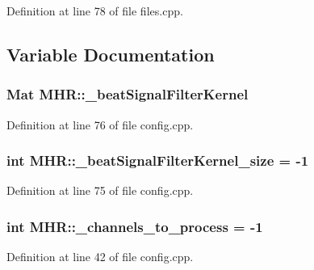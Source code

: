 Definition at line 78 of file files.\+cpp.



\subsection{Variable Documentation}
\hypertarget{namespace_m_h_r_ab83e011c36b7688dab5ef024c8894300}{
\subsubsection[{\+\_\+beat\+Signal\+Filter\+Kernel}]{\setlength{\rightskip}{0pt plus 5cm}Mat M\+H\+R\+::\+\_\+beat\+Signal\+Filter\+Kernel}}\label{namespace_m_h_r_ab83e011c36b7688dab5ef024c8894300}


Definition at line 76 of file config.\+cpp.

\hypertarget{namespace_m_h_r_a5d907d8ef896004dce9f0fd1d47b77e7}{
\subsubsection[{\+\_\+beat\+Signal\+Filter\+Kernel\+\_\+size}]{\setlength{\rightskip}{0pt plus 5cm}int M\+H\+R\+::\+\_\+beat\+Signal\+Filter\+Kernel\+\_\+size = -\/1}}\label{namespace_m_h_r_a5d907d8ef896004dce9f0fd1d47b77e7}


Definition at line 75 of file config.\+cpp.

\hypertarget{namespace_m_h_r_a02a81ed541f6536b1632d65c8f2ad0d3}{
\subsubsection[{\+\_\+channels\+\_\+to\+\_\+process}]{\setlength{\rightskip}{0pt plus 5cm}int M\+H\+R\+::\+\_\+channels\+\_\+to\+\_\+process = -\/1}}\label{namespace_m_h_r_a02a81ed541f6536b1632d65c8f2ad0d3}


Definition at line 42 of file config.\+cpp.

